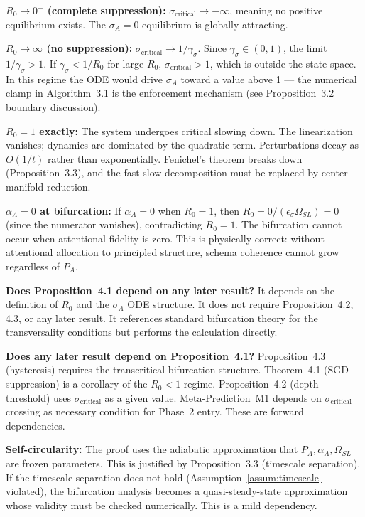 \begin{boundary-case}
\textbf{$R_0 \to 0^+$ (complete suppression):}
$\sigma_{\text{critical}} \to -\infty$, meaning no positive equilibrium
exists. The $\sigma_A = 0$ equilibrium is globally attracting.

\textbf{$R_0 \to \infty$ (no suppression):}
$\sigma_{\text{critical}} \to 1/\gamma_\sigma$. Since $\gamma_\sigma \in (0,1)$,
the limit $1/\gamma_\sigma > 1$. If $\gamma_\sigma < 1/R_0$ for
large $R_0$, $\sigma_{\text{critical}} > 1$, which is outside the state
space. In this regime the ODE would drive $\sigma_A$ toward a value
above 1 --- the numerical clamp in Algorithm~3.1 is the enforcement
mechanism (see Proposition~3.2 boundary discussion).

\textbf{$R_0 = 1$ exactly:} The system undergoes critical slowing down.
The linearization vanishes; dynamics are dominated by the quadratic
term. Perturbations decay as $O(1/t)$ rather than exponentially.
Fenichel's theorem breaks down (Proposition~3.3), and the fast-slow
decomposition must be replaced by center manifold reduction.

\textbf{$\alpha_A = 0$ at bifurcation:} If $\alpha_A = 0$ when $R_0 = 1$,
then $R_0 = 0/(\epsilon_\sigma \Omega_{SL}) = 0$ (since the numerator
vanishes), contradicting $R_0 = 1$. The bifurcation cannot occur when
attentional fidelity is zero. This is physically correct: without
attentional allocation to principled structure, schema coherence
cannot grow regardless of $P_A$.
\end{boundary-case}

\begin{circularity-check}
\textbf{Does Proposition~4.1 depend on any later result?}
It depends on the definition of $R_0$ and the $\sigma_A$ ODE structure.
It does not require Proposition~4.2, 4.3, or any later result. It
references standard bifurcation theory \citep{kuznetsov1998} for the
transversality conditions but performs the calculation directly.

\textbf{Does any later result depend on Proposition~4.1?}
Proposition~4.3 (hysteresis) requires the transcritical bifurcation
structure. Theorem~4.1 (SGD suppression) is a corollary of the
$R_0 < 1$ regime. Proposition~4.2 (depth threshold) uses
$\sigma_{\text{critical}}$ as a given value. Meta-Prediction~M1
depends on $\sigma_{\text{critical}}$ crossing as necessary condition
for Phase~2 entry. These are forward dependencies.

\textbf{Self-circularity:} The proof uses the adiabatic approximation
that $P_A, \alpha_A, \Omega_{SL}$ are frozen parameters. This is
justified by Proposition~3.3 (timescale separation). If the timescale
separation does not hold (Assumption~\ref{assum:timescale} violated),
the bifurcation analysis becomes a quasi-steady-state approximation
whose validity must be checked numerically. This is a mild dependency.
\end{circularity-check}
